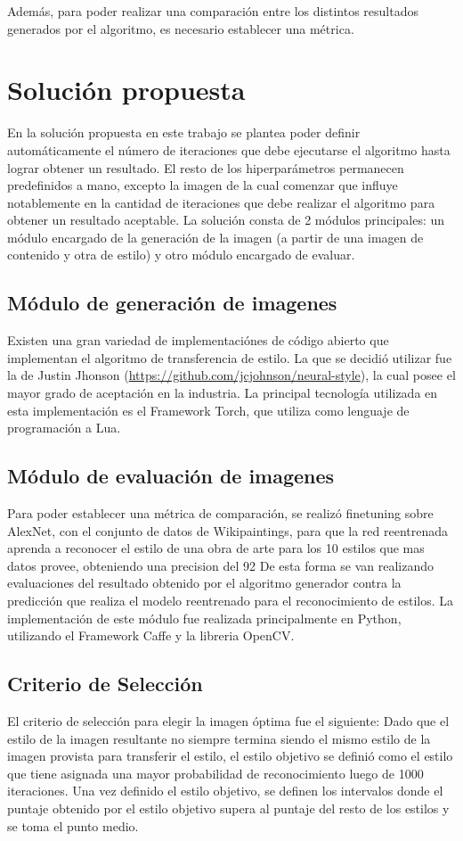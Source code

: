 \documentclass[a4paper,11pt,spanish]{book}
\begin{document}
    Además, para poder realizar una comparación entre los distintos resultados generados por el algoritmo, es necesario establecer una métrica.
  
  \section{Solución propuesta}
    En la solución propuesta en este trabajo se plantea poder definir automáticamente el número de iteraciones que debe ejecutarse el algoritmo hasta lograr obtener un resultado.
    El resto de los hiperparámetros permanecen predefinidos a mano, excepto la imagen de la cual comenzar que influye notablemente en la cantidad de iteraciones que debe realizar el 
    algoritmo para obtener un resultado aceptable.
    La solución consta de 2 módulos principales: un módulo encargado de la generación de la imagen (a partir de una imagen de contenido y otra de estilo) y otro módulo encargado de 
    evaluar.
    \subsection{Módulo de generación de imagenes}
      Existen una gran variedad de implementaciónes de código abierto que implementan el algoritmo de transferencia de estilo. La que se decidió utilizar fue la de Justin Jhonson (\url{https://github.com/jcjohnson/neural-style}),
      la cual posee el mayor grado de aceptación en la industria.
      La principal tecnología utilizada en esta implementación es el Framework Torch, que utiliza como lenguaje de programación a Lua.
    \subsection{Módulo de evaluación de imagenes}
      Para poder establecer una métrica de comparación, se realizó finetuning sobre AlexNet, con el conjunto de datos de Wikipaintings, para que la red reentrenada aprenda a reconocer
      el estilo de una obra de arte para los 10 estilos que mas datos provee, obteniendo una precision del 92%
      De esta forma se van realizando evaluaciones del resultado obtenido por el algoritmo generador contra la predicción que realiza el modelo reentrenado para el reconocimiento de estilos.
      La implementación de este módulo fue realizada principalmente en Python, utilizando el Framework Caffe y la libreria OpenCV.
    \subsection{Criterio de Selección}
      El criterio de selección para elegir la imagen óptima fue el siguiente:
      Dado que el estilo de la imagen resultante no siempre termina siendo el mismo estilo de la imagen provista para transferir el estilo, el estilo objetivo se definió como el estilo
      que tiene asignada una mayor probabilidad de reconocimiento luego de 1000 iteraciones.
      Una vez definido el estilo objetivo, se definen los intervalos donde el puntaje obtenido por el estilo objetivo supera al puntaje del resto de los estilos y se toma el punto medio.
\end{document}
